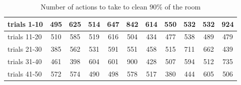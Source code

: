 \begin{table}[h]
    \centering
    \begin{tabular}{|l|c|c|c|c|c|c|c|c|c|c|}
        \hline
        trials 1-10 & 495 & 625 & 514 & 647 & 842 & 614 & 550 & 532 & 532 & 924\\ \hline
        trials 11-20 & 510 & 585 & 519 & 616 & 504 & 434 & 477 & 538 & 489 & 479\\ \hline
        trials 21-30 & 385 & 562 & 531 & 591 & 551 & 458 & 515 & 711 & 662 & 439\\ \hline
        trials 31-40 & 461 & 398 & 604 & 601 & 900 & 428 & 507 & 594 & 512 & 735\\ \hline
        trials 41-50 & 572 & 574 & 490 & 498 & 578 & 517 & 380 & 444 & 605 & 506\\ \hline
    \end{tabular}
    \caption{Number of actions to take to clean $90\%$ of the room}\label{tab:agent2}
\end{table}


